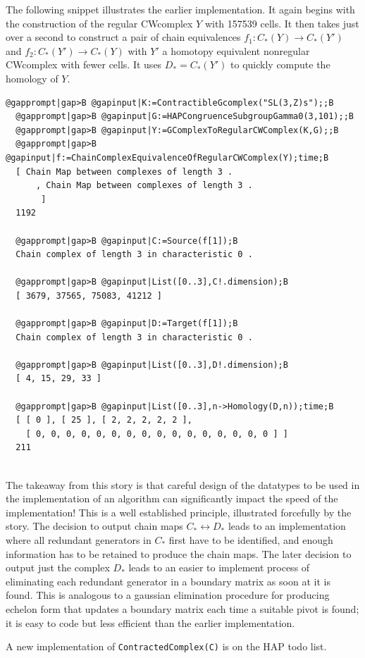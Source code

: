 \documentclass[a4paper,11pt]{report}
\begin{document}
{{ The following snippet illustrates the earlier implementation. It again begins
with the construction of the regular CW\texttt{}complex $Y$ with 157539 cells. It then takes just over a second to construct a pair of
chain equivalences $f_1\colon C_\ast(Y) \rightarrow C_\ast(Y')$ and $f_2\colon C_\ast(Y') \rightarrow C_\ast(Y)$ with $Y'$ a homotopy equivalent non\texttt{}regular
CW\texttt{}complex with fewer cells. It uses $D_\ast=C_\ast(Y')$ to quickly compute the homology of $Y$. 
\begin{Verbatim}[commandchars=@|B,fontsize=\small,frame=single,label=Example]
  @gapprompt|gap>B @gapinput|K:=ContractibleGcomplex("SL(3,Z)s");;B
  @gapprompt|gap>B @gapinput|G:=HAPCongruenceSubgroupGamma0(3,101);;B
  @gapprompt|gap>B @gapinput|Y:=GComplexToRegularCWComplex(K,G);;B
  @gapprompt|gap>B @gapinput|f:=ChainComplexEquivalenceOfRegularCWComplex(Y);time;B
  [ Chain Map between complexes of length 3 . 
      , Chain Map between complexes of length 3 . 
       ]
  1192
  
  @gapprompt|gap>B @gapinput|C:=Source(f[1]);B
  Chain complex of length 3 in characteristic 0 . 
  
  @gapprompt|gap>B @gapinput|List([0..3],C!.dimension);B
  [ 3679, 37565, 75083, 41212 ]
  
  @gapprompt|gap>B @gapinput|D:=Target(f[1]);B
  Chain complex of length 3 in characteristic 0 . 
  
  @gapprompt|gap>B @gapinput|List([0..3],D!.dimension);B
  [ 4, 15, 29, 33 ]
  
  @gapprompt|gap>B @gapinput|List([0..3],n->Homology(D,n));time;B
  [ [ 0 ], [ 25 ], [ 2, 2, 2, 2, 2 ], 
    [ 0, 0, 0, 0, 0, 0, 0, 0, 0, 0, 0, 0, 0, 0, 0, 0 ] ]
  211
  
\end{Verbatim}
 

 The takeaway from this story is that careful design of the datatypes to be
used in the implementation of an algorithm can significantly impact the speed
of the implementation! This is a well established principle, illustrated
forcefully by the story. The decision to output chain maps $C_\ast \leftrightarrow D_\ast$ leads to an implementation where all redundant generators in $C_\ast$ first have to be identified, and enough information has to be retained to
produce the chain maps. The later decision to output just the complex $D_\ast$ leads to an easier to implement process of eliminating each redundant
generator in a boundary matrix as soon at it is found. This is analogous to a
gaussian elimination procedure for producing echelon form that updates a
boundary matrix each time a suitable pivot is found; it is easy to code but
less efficient than the earlier implementation. 

 

 A new implementation of \texttt{ContractedComplex(C)} is on the \textsc{HAP} to\texttt{}do list. }

 }
\end{document}
